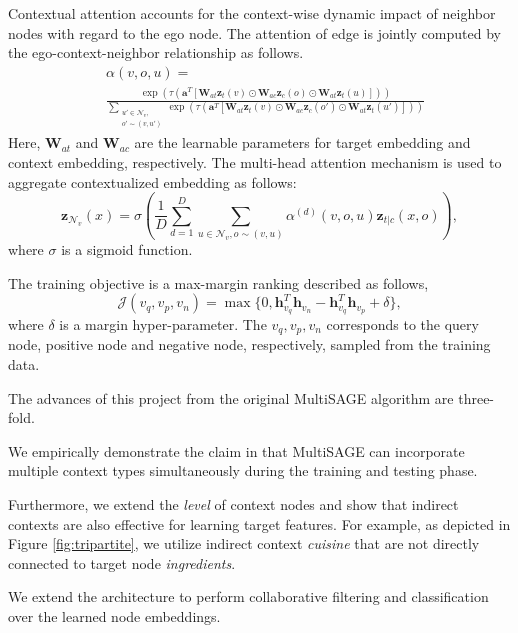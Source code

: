 Contextual attention accounts for the context-wise dynamic impact of neighbor nodes with regard to the ego node. The attention of edge is jointly computed by the ego-context-neighbor relationship as follows.
\begin{equation}
\begin{split}
    & \alpha(v, o, u) = \\
    & \frac{\exp\left(\tau(\mathbf{a}^T[\mathbf{W}_{at}\mathbf{z}_t(v) \odot \mathbf{W}_{ac}\mathbf{z}_c(o) \odot \mathbf{W}_{at}\mathbf{z}_t(u)])\right)}{\sum\limits_{\substack{u' \in \mathcal{N}_v,\\o' \sim (v, u')}}\exp\left(\tau(\mathbf{a}^T[\mathbf{W}_{at}\mathbf{z}_t(v) \odot \mathbf{W}_{ac}\mathbf{z}_c(o') \odot \mathbf{W}_{at}\mathbf{z}_t(u')])\right)}
\end{split}
\end{equation}
Here, $\mathbf{W}_{at}$ and $\mathbf{W}_{ac}$ are the learnable parameters for target embedding and context embedding, respectively. The multi-head attention mechanism is used to aggregate contextualized embedding as follows:
\begin{equation}
    \mathbf{z}_{\mathcal{N}_v}(x) = \sigma \left( \frac{1}{D} \sum_{d=1}^{D} \sum_{u \in \mathcal{N}_v, o \sim (v, u)} \alpha^{(d)}(v, o, u) \mathbf{z}_{t|c}(x, o) \right),
\end{equation}
where $\sigma$ is a sigmoid function.

The training objective is a max-margin ranking described as follows,
\begin{equation}
    \mathcal{J}(v_q, v_p, v_n) = \max\{ 0, \mathbf{h}_{v_q}^T \mathbf{h}_{v_n} - \mathbf{h}_{v_q}^T \mathbf{h}_{v_p} + \delta \},
\end{equation}
where $\delta$ is a margin hyper-parameter. The $v_q, v_p, v_n$ corresponds to the query node, positive node and negative node, respectively, sampled from the training data.

The advances of this project from the original MultiSAGE algorithm are three-fold.
\bit
    \item We empirically demonstrate the claim in \cite{10.1145/3394486.3403293} that MultiSAGE can incorporate multiple context types simultaneously during the training and testing phase.
    \item Furthermore, we extend the \emph{level} of context nodes and show that indirect contexts are also effective for learning target features. For example, as depicted in Figure \ref{fig:tripartite}, we utilize indirect context \textit{cuisine} that are not directly connected to target node \textit{ingredients}.
    \item We extend the architecture to perform collaborative filtering and classification over the learned node embeddings.
\eit

